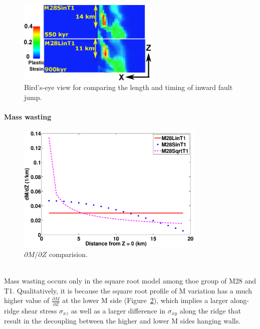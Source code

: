\begin{figure}[h]
  \centering
    \includegraphics[width=0.6\textwidth]{./Figures/fig_Results4_2_secondary_fault_length_comparison1.eps}
  \caption{Bird's-eye view for comparing the length and timing of inward fault jump.}
 \label{fig_Results4_2}
\end{figure}

\paragraph{Mass wasting}

\begin{figure}[h]
  \centering
    \includegraphics[width=0.8\textwidth]{./Figures/fig_Results_3_3_1_M_type_plot_dM_dZ.eps}
  \caption{$\partial M/ \partial Z$ comparision.}
 \label{fig_Results_3_3_1_M_type_plot_dM_dZ}
\end{figure}  

~\\
Mass wasting occurs only in the square root model among thoe group of M28 and T1. Qualitatively, it is because the square root profile of M variation has a much higher value of $\frac{\partial M}{\partial Z}$ at the lower M side (Figure~\hyperref[fig_Results_3_3_1_M_type_plot_dM_dZ]{\ref{fig_Results_3_3_1_M_type_plot_dM_dZ}}), which implies a larger along-ridge shear stress $\sigma_{xz}$ as well as a larger difference in $\sigma_{xy}$ along the ridge that result in the decoupling between the higher and lower M sides hanging walls.

